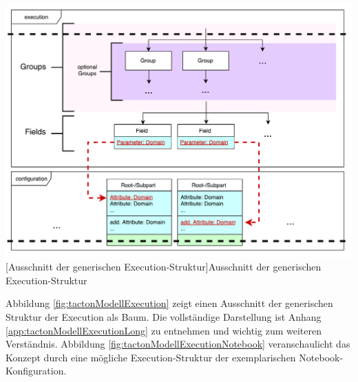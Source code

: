 \documentclass[11pt, a4paper, titlepage, listof=totoc, bibliography=totoc, index=totoc, twoside, openright, headings=normal, draft]{scrreprt}
\begin{document}
\vspace{1em}
\begin{minipage}{\linewidth}
	\centering
	\includegraphics[width=0.8\linewidth]{Abbildungen/tactonModellExecutionShort.pdf}
	[Ausschnitt der generischen Execution-Struktur]{Ausschnitt der generischen Execution-Struktur}
	\label{fig:tactonModellExecution}
\end{minipage}
\vspace{0.3em}

Abbildung \ref{fig:tactonModellExecution} zeigt einen Ausschnitt der generischen Struktur der Execution als Baum. Die vollständige Darstellung ist Anhang \ref{app:tactonModellExecutionLong} zu entnehmen und wichtig zum weiteren Verständnis. Abbildung \ref{fig:tactonModellExecutionNotebook} veranschaulicht das Konzept durch eine mögliche Execution-Struktur der exemplarischen Notebook-Konfiguration.
\end{document}
